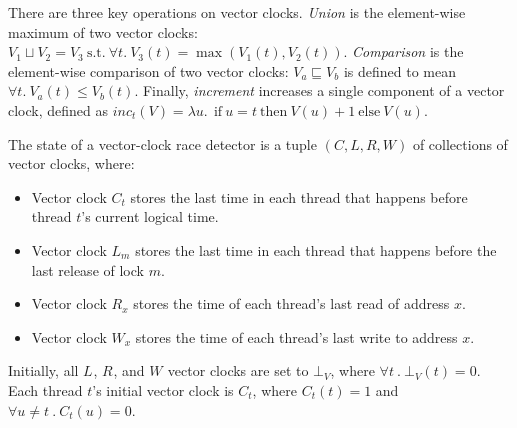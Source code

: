 \documentclass[preprint, 10pt]{sigplanconf}
\newcommand{\Tid}{t}
\newcommand{\TidU}{u}
\newcommand{\Address}{x}
\newcommand{\Lock}{m}
\newcommand{\VC}{V}
\newcommand{\VCFont}{}
\newcommand{\ThreadVC}[1]{\VCFont{C}_{#1}}
\newcommand{\LockVC}[1]{\VCFont{L}_{#1}}
\newcommand{\ReadVC}[1]{\VCFont{R}_{#1}}
\newcommand{\WriteVC}[1]{\VCFont{W}_{#1}}
\newcommand{\SuchThat}{\ \text{s.t.}\ }
\newcommand{\Bind}{\ .\ }
\newcommand{\VCMax}{\sqcup}
\newcommand{\VCCompare}{\sqsubseteq}
\begin{document}
  There are three key operations on vector clocks.
\emph{Union} is the element-wise maximum of two vector clocks:
$\VC_1 \VCMax \VC_2 = \VC_3 \SuchThat \forall \Tid.\ \VC_3(\Tid) =
\max(\VC_1(\Tid), \VC_2(\Tid))$. \emph{Comparison} is the element-wise
comparison of two vector clocks: $\VC_a \VCCompare \VC_b$ is defined to mean $\forall
\Tid.\ \VC_a(\Tid) \leq \VC_b(\Tid)$.  Finally, \emph{increment} increases a single component of a vector clock, defined as $\mathit{inc}_t(V) = \lambda u.\ \mathrm{~if~} u=t \mathrm{~then~} V(u)+1 \mathrm{~else~} V(u)$.

The state of a vector-clock race detector is a tuple $(C, L, R, W)$ of collections of vector clocks, where:
\begin{itemize}
\item
 Vector clock $\ThreadVC{\Tid}$ stores the last time in each thread that happens before thread $\Tid$'s current logical time.
\item
 Vector clock $\LockVC{\Lock}$ stores the last time in each thread that happens before the last release of lock $\Lock$.  
\item
 Vector clock $\ReadVC{\Address}$ stores
  the time of each thread's last read of address $\Address$.
\item
 Vector clock $\WriteVC{\Address}$ stores
  the time of each thread's last write to address $\Address$.
\end{itemize}

Initially, all $\LockVC{}$, $\ReadVC{}$, and $\WriteVC{}$ vector clocks are
set to $\bot_V$, where $\forall \Tid \Bind \bot_V(\Tid) = 0$.  Each thread $\Tid$'s
initial vector clock is $\ThreadVC{\Tid}$, where $\ThreadVC{\Tid}(\Tid) = 1$
and $\forall \TidU \neq \Tid \Bind \ThreadVC{\Tid}(\TidU) = 0$.  
\end{document}
